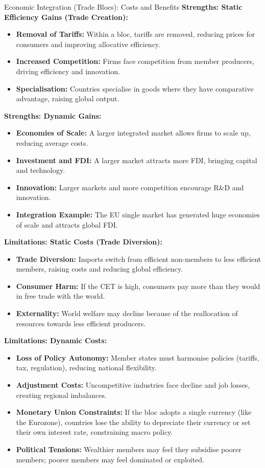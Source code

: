 \documentclass[11pt, a4paper, twoside]{book}
\begin{document}
\begin{evaluation}{Economic Integration (Trade Blocs): Costs and Benefits}
\textbf{Strengths: Static Efficiency Gains (Trade Creation):}
\begin{itemize}
  \item \textbf{Removal of Tariffs:} Within a bloc, tariffs are removed, reducing prices for consumers and improving allocative efficiency.
  \item \textbf{Increased Competition:} Firms face competition from member producers, driving efficiency and innovation.
  \item \textbf{Specialisation:} Countries specialise in goods where they have comparative advantage, raising global output.
\end{itemize}

\textbf{Strengths: Dynamic Gains:}
\begin{itemize}
  \item \textbf{Economies of Scale:} A larger integrated market allows firms to scale up, reducing average costs.
  \item \textbf{Investment and FDI:} A larger market attracts more FDI, bringing capital and technology.
  \item \textbf{Innovation:} Larger markets and more competition encourage R\&D and innovation.
  \item \textbf{Integration Example:} The EU single market has generated huge economies of scale and attracts global FDI.
\end{itemize}

\textbf{Limitations: Static Costs (Trade Diversion):}
\begin{itemize}
  \item \textbf{Trade Diversion:} Imports switch from efficient non-members to less efficient members, raising costs and reducing global efficiency.
  \item \textbf{Consumer Harm:} If the CET is high, consumers pay more than they would in free trade with the world.
  \item \textbf{Externality:} World welfare may decline because of the reallocation of resources towards less efficient producers.
\end{itemize}

\textbf{Limitations: Dynamic Costs:}
\begin{itemize}
  \item \textbf{Loss of Policy Autonomy:} Member states must harmonise policies (tariffs, tax, regulation), reducing national flexibility.
  \item \textbf{Adjustment Costs:} Uncompetitive industries face decline and job losses, creating regional imbalances.
  \item \textbf{Monetary Union Constraints:} If the bloc adopts a single currency (like the Eurozone), countries lose the ability to depreciate their currency or set their own interest rate, constraining macro policy.
  \item \textbf{Political Tensions:} Wealthier members may feel they subsidise poorer members; poorer members may feel dominated or exploited.
\end{itemize}


\end{evaluation}
\end{document}

